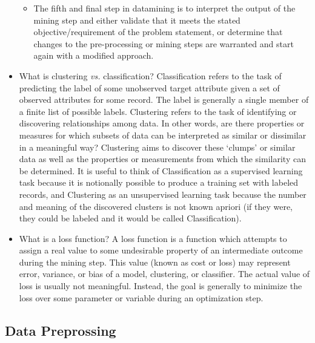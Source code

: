 \documentclass[fleqn,10pt]{SelfArx} %
\begin{document}
\begin{itemize}[noitemsep]
\begin{itemize}
	\item The fifth and final step in datamining is to interpret the output of the mining step and either validate that it meets the stated objective/requirement of the problem statement, or determine that changes to the pre-processing or mining steps are warranted and start again with a modified approach.

\end{itemize}

\item What is clustering \textit{vs.} classification?  Classification refers to the task of predicting the label of some unobserved target attribute given a set of observed attributes for some record.  The label is generally a single member of a finite list of possible labels.  Clustering refers to the task of identifying or discovering relationships among data.  In other words, are there properties or measures for which subsets of data can be interpreted as similar or dissimilar in a meaningful way?  Clustering aims to discover these `clumps' or similar data as well as the properties or measurements from which the similarity can be determined.  It is useful to think of Classification as a supervised learning task because it is notionally possible to produce a training set with labeled records, and Clustering as an unsupervised learning task because the number and meaning of the discovered clusters is not known apriori (if they were, they could be labeled and it would be called Classification).

\item What is a loss function? A loss function is a function which attempts to assign a real value to some undesirable property of an intermediate outcome during the mining step.  This value (known as cost or loss) may represent error, variance, or bias of a model, clustering, or classifier.  The actual value of loss is usually not meaningful.  Instead, the goal is generally to minimize the loss over some parameter or variable during an optimization step.

\end{itemize}


\subsection{Data Preprossing}
\end{document}
